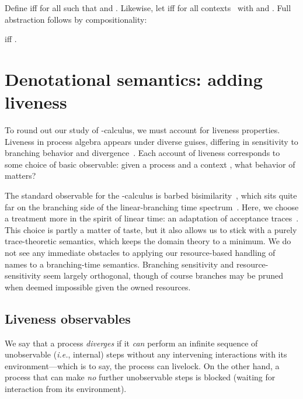 \documentclass{entcs}
\begin{document}
Define  iff  for all  such that 
and .  Likewise, let  iff
 for all  contexts~
with  and .
Full abstraction follows by compositionality:

\begin{theorem}
   iff .
\end{theorem}

\section{Denotational semantics: adding liveness}
\label{sec:liveness}

To round out our study of -calculus, we must account for liveness
properties.  Liveness in process algebra appears under diverse guises,
differing in sensitivity to branching behavior and
divergence~\cite{Glabbeek1988}.  Each account of liveness corresponds
to some choice of basic observable: given a process  and a context
, what behavior of  matters?  

The standard observable for the -calculus is barbed
bisimilarity~\cite{barbed}, which sits quite far on the branching side
of the linear-branching time spectrum~\cite{Glabbeek1988}.  Here, we
choose a treatment more in the spirit of linear time: an adaptation of
acceptance traces~\cite{Hennessy2002}.  This choice is partly a matter
of taste, but it also allows us to stick with a purely trace-theoretic
semantics, which keeps the domain theory to a minimum.  We do not see
any immediate obstacles to applying our resource-based handling of
names to a branching-time semantics.  Branching sensitivity and
resource-sensitivity seem largely orthogonal, though of course
branches may be pruned when deemed impossible given the owned
resources.

\subsection{Liveness observables}

We say that a process \emph{diverges} if it \emph{can} perform an
infinite sequence of unobservable (\emph{i.e.}, internal) steps
without any intervening interactions with its environment---which is
to say, the process can livelock.  On the other hand, a process that
can make \emph{no} further unobservable steps is blocked (waiting for
interaction from its environment).
\end{document}
